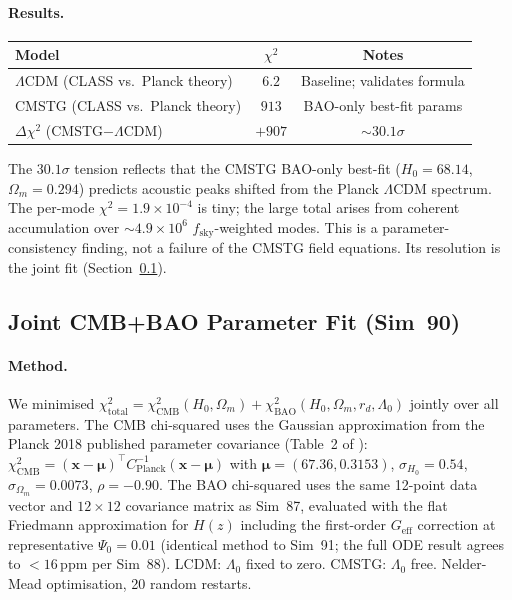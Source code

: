 \documentclass[12pt,a4paper]{article}
\begin{document}
\paragraph{Results.}
\begin{center}
\begin{tabular}{lcc}
\toprule
Model & $\chi^2$ & Notes \\
\midrule
$\Lambda$CDM (CLASS vs.\ Planck theory) & $6.2$ & Baseline; validates formula \\
CMSTG (CLASS vs.\ Planck theory) & $913$ & BAO-only best-fit params \\
$\Delta\chi^2$ (CMSTG$-\Lambda$CDM) & $+907$ & $\sim 30.1\sigma$ \\
\bottomrule
\end{tabular}
\end{center}
The $30.1\sigma$ tension reflects that the CMSTG BAO-only best-fit
($H_0 = 68.14$, $\Omega_m = 0.294$) predicts acoustic peaks shifted
from the Planck $\Lambda$CDM spectrum. The per-mode $\chi^2 = 1.9 \times 10^{-4}$
is tiny; the large total arises from coherent accumulation over $\sim 4.9 \times 10^6$
$f_{\mathrm{sky}}$-weighted modes. This is a parameter-consistency finding, not a
failure of the CMSTG field equations. Its resolution is the joint fit (Section~\ref{sec:obs_joint}).

\subsection{Joint CMB+BAO Parameter Fit (Sim~90)}
\label{sec:obs_joint}

\paragraph{Method.} We minimised
$\chi^2_{\mathrm{total}} = \chi^2_{\mathrm{CMB}}(H_0, \Omega_m) + \chi^2_{\mathrm{BAO}}(H_0, \Omega_m, r_d, \Lambda_0)$
jointly over all parameters. The CMB chi-squared uses the Gaussian
approximation from the Planck 2018 published parameter covariance
(Table~2 of \citealt{Planck2020}):
$\chi^2_{\mathrm{CMB}} = (\mathbf{x}-\boldsymbol{\mu})^\top C_{\mathrm{Planck}}^{-1}(\mathbf{x}-\boldsymbol{\mu})$
with $\boldsymbol{\mu} = (67.36, 0.3153)$,
$\sigma_{H_0} = 0.54$, $\sigma_{\Omega_m} = 0.0073$, $\rho = -0.90$.
The BAO chi-squared uses the same 12-point data vector and $12\times12$
covariance matrix as Sim~87, evaluated with the flat Friedmann
approximation for $H(z)$ including the first-order $G_\mathrm{eff}$
correction at representative $\Psi_0 = 0.01$
(identical method to Sim~91; the full ODE result agrees to $<16$\,ppm
per Sim~88).
LCDM: $\Lambda_0$ fixed to zero. CMSTG: $\Lambda_0$ free.
Nelder-Mead optimisation, 20 random restarts.
\end{document}
